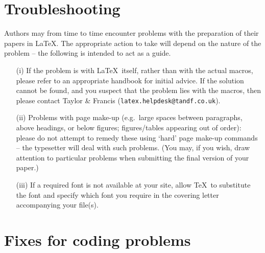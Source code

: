 \documentclass{gCMB2e}
\begin{document}
\section{Troubleshooting}

Authors may from time to time encounter problems with the  preparation
of their papers in \LaTeX\/. The appropriate  action  to
take will depend on the nature of the problem -- the following is
intended to act as a guide.
%
\begin{enumerate}
\item[(i)] If the problem is with \LaTeX\ itself, rather than with the
actual macros, please refer to an appropriate handbook for
initial advice. If the solution cannot be found, and you
suspect that the problem lies with the macros, then please contact
Taylor \& Francis ({\tt latex.helpdesk@tandf.co.uk}).

\item[(ii)] Problems with page make-up (e.g.\ large spaces between paragraphs,
above headings, or below figures; figures/tables appearing out of order):
please do not attempt to remedy these using `hard' page make-up
commands -- the typesetter will deal with such problems. (You may, if you
wish, draw attention to particular problems when submitting the final version
of your paper.)

\item[(iii)] If a required font is not available at your site, allow \TeX\
to substitute the font and specify which font you require in the
covering letter accompanying your file(s).
\end{enumerate}


\section{Fixes for coding problems}
\end{document}
